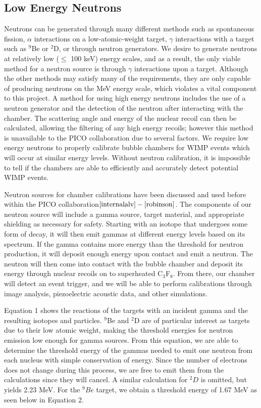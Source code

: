 \documentclass[%
12pt,
twoside,
reprint,
amsmath,amssymb,
aps,
]{article}
\begin{document}
	\subsection{Low Energy Neutrons}
	\par Neutrons can be generated through many different methods such as spontaneous fission, $\alpha$ interactions on a low-atomic-weight target, $\gamma$ interactions with a target such as $^{9}$Be or $^{2}$D, or through neutron generators. We desire to generate neutrons at relatively low ($\leq$ 100 keV) energy scales, and as a result, the only viable method for a neutron source is through $\gamma$ interactions upon a target. Although the other methods may satisfy many of the requirements, they are only capable of producing neutrons on the MeV energy scale, which violates a vital component to this project. A method for using high energy neutrons includes the use of a neutron generator and the detection of the neutron after interacting with the chamber. The scattering angle and energy of the nuclear recoil can then be calculated, allowing the filtering of any high energy recoils; however this method is unavailable to the PICO collaboration due to several factors. We require low energy neutrons to properly calibrate bubble chambers for WIMP events which will occur at similar energy levels. Without neutron calibration, it is impossible to tell if the chambers are able to efficiently and accurately detect potential WIMP events.
	\par Neutron sources for chamber calibrations have been discussed and used before within the PICO collaboration${\cite{internalalv}-\cite{robinson}}$. The components of our neutron source will include a gamma source, target material, and appropriate shielding as necessary for safety. Starting with an isotope that undergoes some form of decay, it will then emit gammas at different energy levels based on its spectrum. If the gamma contains more energy than the threshold for neutron production, it will deposit enough energy upon contact and emit a neutron. The neutron will then come into contact with the bubble chamber and deposit its energy through nuclear recoils on to superheated C$_{3}$F$_{8}$. From there, our chamber will detect an event trigger, and we will be able to perform calibrations through image analysis, piezoelectric acoustic data, and other simulations.
	\par Equation 1 shows the reactions of the targets with an incident gamma and the resulting isotopes and particles. $^{9}$Be and $^{2}$D are of particular interest as targets due to their low atomic weight, making the threshold energies for neutron emission low enough for gamma sources. From this equation, we are able to determine the threshold energy of the gammas needed to emit one neutron from each nucleus with simple conservation of energy. Since the number of electrons does not change during this process, we are free to emit them from the calculations since they will cancel. A similar calculation for $^{2}D$ is omitted, but yields 2.23 MeV. For the $^{9}Be$ target, we obtain a threshold energy of 1.67 MeV as seen below in Equation 2.
\end{document}

